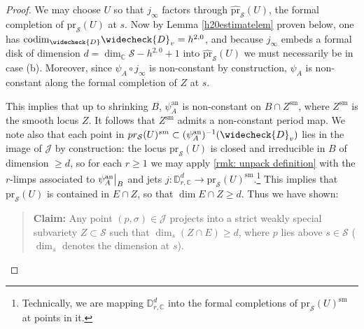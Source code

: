 \documentclass[letter, 11pt]{article}
\theoremstyle{plain}
\theoremstyle{definition}
\newcommand{\IC}{\mathbb{C}}
\newcommand{\che}[1]{\widecheck{#1}}
\newcommand{\<}{\langle}
\renewcommand{\>}{\rangle}
\newcommand{\sS}{\mathcal{S}}
\newcommand{\codim}{\mathrm{codim}}
\newcommand{\pr}{\mathrm{pr}}
\newcommand\restr[2]{{
	\left.\kern-\nulldelimiterspace
	#1
	\vphantom{\big|}
	\right|_{#2}
	}}
\begin{document}
\begin{proof}
We may choose $U$ so that $j_{\infty}$ factors through $\hat{\pr}_\sS(U)$, the formal completion of $\pr_\sS(U)$ at $s$. Now by Lemma \ref{h20estimatelem} proven below, one has $\codim_{\che{D}} \che{D}_{v} = h^{2,0}$, and because $j_{\infty}$ embeds a formal disk of dimension $d = \dim_{\IC} \sS - h^{2,0} + 1$ into $\hat{\pr}_{\sS}(U)$ we must necessarily be in case (b). Moreover, since $\psi_{A} \circ j_{\infty}$ is non-constant by construction, $\psi_{A}$ is non-constant along the formal completion of $Z$ at $s$. 


This implies that up to shrinking $B$, $\psi_{A}^{\mathrm{an}}$ is non-constant on $B \cap Z^{\mathrm{sm}}$, where $Z^{\textrm{sm}}$ is the smooth locus $Z$. It follows that $Z^{\textrm{sm}}$ admits a non-constant period map. We note also that each point in $\textrm{pr}_{\sS}(U)^{\textrm{sm}} \subset (\psi_{A}^{\mathrm{an}})^{-1}(\che{D}_{v})$ lies in the image of $\mathcal{J}$ by construction: the locus $\textrm{pr}_{\sS}(U)$ is closed and irreducible in $B$ of dimension $\geq d$, so for each $r \ge 1$ we may apply \ref{rmk: unpack definition} with the $r$-limps associated to $\restr{\psi_{A}^{\mathrm{an}}}{B}$ and jets $j : \mathbb{D}^d_{r,\mathbb{C}} \to \textrm{pr}_{\sS}(U)^{\textrm{sm}}$.\footnote{Technically, we are mapping $\mathbb{D}^d_{r,\mathbb{C}}$ into the formal completions of $\textrm{pr}_{\sS}(U)^{\textrm{sm}}$ at points in it.} This implies that $\textrm{pr}_{\sS}(U)$ is contained in $E \cap Z$, so that $\dim E \cap Z \ge d$. Thus we have shown: 

\begin{quote}
\textbf{Claim:} Any point $(p, \sigma) \in \mathcal{J}$ projects into a strict weakly special subvariety $Z \subset \sS$ such that $\dim_{s} (Z \cap E) \geq d$, where $p$ lies above $s \in \sS$ ($\dim_s$ denotes the dimension at $s$). 
\end{quote}

\end{proof}
\end{document}
